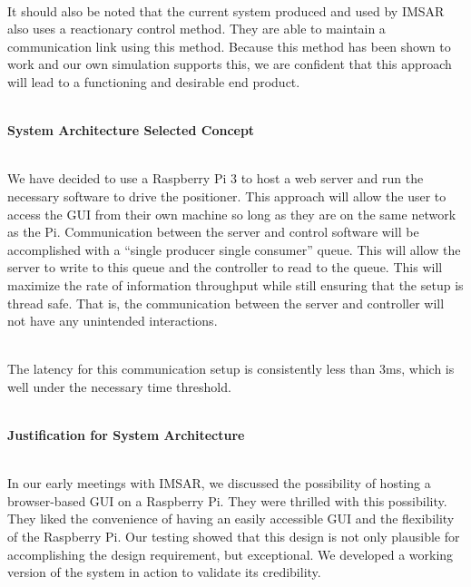  ~\\
It should also be noted that the current system produced and used by IMSAR also uses a reactionary control method. They are able to maintain a communication link using this method. Because this method has been shown to work and our own simulation supports this, we are confident that this approach will lead to a functioning and desirable end product.  

~\\
\textbf{System Architecture Selected Concept} 

 ~\\
We have decided to use a Raspberry Pi 3 to host a web server and run the necessary software to drive the positioner. This approach will allow the user to access the GUI from their own machine so long as they are on the same network as the Pi. Communication between the server and control software will be accomplished with a “single producer single consumer” queue. This will allow the server to write to this queue and the controller to read to the queue. This will maximize the rate of information throughput while still ensuring that the setup is thread safe. That is, the communication between the server and controller will not have any unintended interactions.   

 ~\\
The latency for this communication setup is consistently less than 3ms, which is well under the necessary time threshold.   

~\\
\textbf{Justification for System Architecture} 

 ~\\
In our early meetings with IMSAR, we discussed the possibility of hosting a browser-based GUI on a Raspberry Pi. They were thrilled with this possibility. They liked the convenience of having an easily accessible GUI and the flexibility of the Raspberry Pi. Our testing showed that this design is not only plausible for accomplishing the design requirement, but exceptional. We developed a working version of the system in action to validate its credibility.   